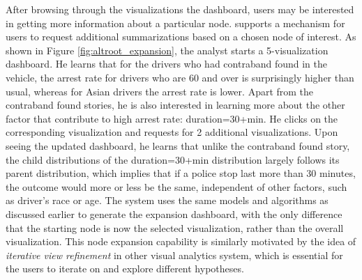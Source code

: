\par After browsing through the visualizations the dashboard, users may be interested in getting more information about a particular node. \system supports a mechanism for users to request additional summarizations based on a chosen node of interest. As shown in Figure \ref{fig:altroot_expansion}, the analyst starts a 5-visualization dashboard. He learns that for the drivers who had contraband found in the vehicle, the arrest rate for drivers who are 60 and over is surprisingly higher than usual, whereas for Asian drivers the arrest rate is lower. Apart from the contraband found stories, he is also interested in learning more about the other factor that contribute to high arrest rate: duration=30+min. He clicks on the corresponding visualization and requests for 2 additional visualizations. Upon seeing the updated dashboard, he learns that unlike the contraband found story, the child distributions of the duration=30+min distribution largely follows its parent distribution, which implies that if a police stop last more than 30 minutes, the outcome would more or less be the same, independent of other factors, such as driver's race or age. The system uses the same models and algorithms as discussed earlier to generate the expansion dashboard, with the only difference that the starting node is now the selected visualization, rather than the overall visualization. This node expansion capability is similarly motivated by the idea of \textit{iterative view refinement} in other visual analytics system\cite{Wongsuphasawat2016,Hoque2017}, which is essential for the users to iterate on and explore different hypotheses. 

